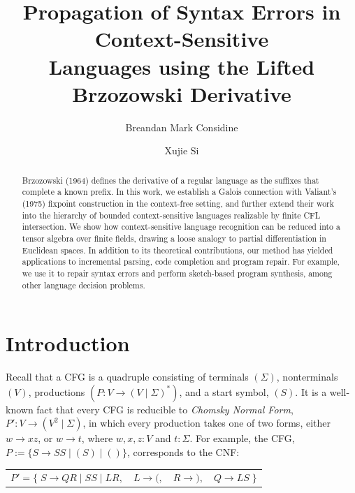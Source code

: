 \documentclass[sigplan,nonacm,anonymous]{acmart}\settopmatter{printfolios=false,printccs=false,printacmref=false}
\begin{document}
  \title{Propagation of Syntax Errors in Context-Sensitive\\Languages using the Lifted Brzozowski Derivative}
  \begin{abstract}
    Brzozowski (1964) defines the derivative of a regular language as the suffixes that complete a known prefix. In this work, we establish a Galois connection with Valiant's (1975) fixpoint construction in the context-free setting, and further extend their work into the hierarchy of bounded context-sensitive languages realizable by finite CFL intersection. We show how context-sensitive language recognition can be reduced into a tensor algebra over finite fields, drawing a loose analogy to partial differentiation in Euclidean spaces. In addition to its theoretical contributions, our method has yielded applications to incremental parsing, code completion and program repair. For example, we use it to repair syntax errors and perform sketch-based program synthesis, among other language decision problems.
  \end{abstract}

  \author{Breandan Mark Considine}

  \author{Xujie Si}

  \maketitle

  \section{Introduction}

  Recall that a CFG is a quadruple consisting of terminals $(\Sigma)$, nonterminals $(V)$, productions $(P\colon V \rightarrow (V \mid \Sigma)^*)$, and a start symbol, $(S)$. It is a well-known fact that every CFG is reducible to \textit{Chomsky Normal Form}, $P'\colon V \rightarrow (V^2 \mid \Sigma)$, in which every production takes one of two forms, either $w \rightarrow xz$, or $w \rightarrow t$, where $w, x, z: V$ and $t: \Sigma$. For example, the CFG, $P:=\{S \rightarrow S S \mid ( S ) \mid ()\}$, corresponds to the CNF:\vspace{-3pt}

  \begin{table}[H]
    \begin{tabular}{llll}
      $P'=\big\{\;S\rightarrow QR \mid SS \mid LR,$ & $L \rightarrow (,$ & $R \rightarrow ),$ & $Q\rightarrow LS\;\big\}$
    \end{tabular}
  \end{table}\vspace{-8pt}
\end{document}
